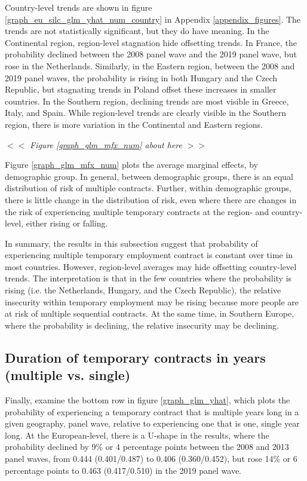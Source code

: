 \documentclass[12pt]{article}
\begin{document}
Country-level trends are shown in figure \ref{graph_eu_silc_glm_yhat_num_country} in Appendix \ref{appendix_figures}.  The trends are not statistically significant, but they do have meaning.  In the Continental region, region-level stagnation hide offsetting trends.  In France, the probability declined between the 2008 panel wave and the 2019 panel wave, but rose in the Netherlands.  Similarly, in the Eastern region, between the 2008 and 2019 panel waves, the probability is rising in both Hungary and the Czech Republic, but stagnating trends in Poland offset these increases in smaller countries.  In the Southern region, declining trends are most visible in Greece, Italy, and Spain.  While region-level trends are clearly visible in the Southern region, there is more variation in the Continental and Eastern regions.

\begin{center}
$<<$ \emph{Figure \ref{graph_glm_mfx_num} about here} $>>$
\end{center}

Figure \ref{graph_glm_mfx_num} plots the average marginal effects, by demographic group.  In general, between demographic groups, there is an equal distribution of risk of multiple contracts.  Further, within demographic groups, there is little change in the distribution of risk, even where there are changes in the risk of experiencing multiple temporary contracts at the region- and country-level, either rising or falling.  

In summary, the results in this subsection suggest that probability of experiencing multiple temporary employment contract is constant over time in most countries.  However, region-level averages may hide offsetting country-level trends.  The interpretation is that in the few countries where the probability is rising (i.e. the Netherlands, Hungary, and the Czech Republic), the relative insecurity within temporary employment may be rising because more people are at risk of multiple sequential contracts.  At the same time, in Southern Europe, where the probability is declining, the relative insecurity may be declining. 

\subsection{Duration of temporary contracts in years (multiple vs. single)}

Finally, examine the bottom row in figure \ref{graph_glm_yhat}, which plots the probability of experiencing a temporary contract that is multiple years long in a given geography, panel wave, relative to experiencing one that is one, single year long.  At the European-level, there is a U-shape in the results, where the probability declined by 9\% or 4 percentage points between the 2008 and 2013 panel waves, from 0.444 (0.401/0.487) to 0.406 (0.360/0.452), but rose 14\% or 6 percentage points to 0.463 (0.417/0.510) in the 2019 panel wave.  
\end{document}

